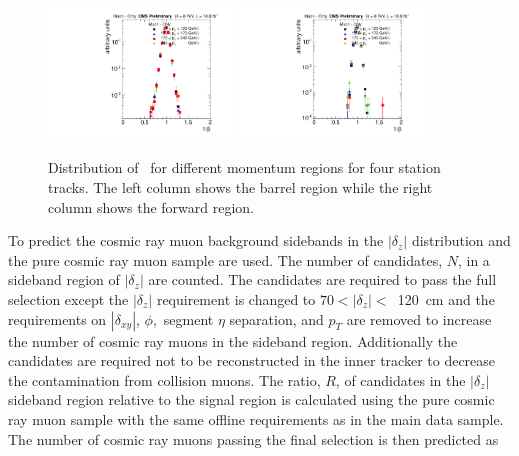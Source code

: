 \begin{figure}
\begin{center}
\includegraphics[clip=true, trim=0.0cm 0cm 3.0cm 0cm,width=0.44\textwidth]{figures/muonly/Control_Data8TeV_Pt_TOFSpectrum_Binned_2}
\includegraphics[clip=true, trim=0.0cm 0cm 3.0cm 0cm,width=0.44\textwidth]{figures/muonly/Control_Data8TeV_Pt_TOFSpectrum_Binned_5}
\caption[Distribution of \invbeta\
  for different momentum regions for four station tracks in the \muononly\ analysis.]
{Distribution of \invbeta\
for different momentum regions for four station tracks.
The  left column shows the barrel region while the right column
shows the forward region.}
\label{fig:MuOnlyControl4}
\end{center}
\end{figure}

To predict the cosmic ray muon background sidebands in the $|\delta_z|$ distribution and the pure cosmic ray muon sample are used. The number of candidates, $N$, 
in a sideband region of $|\delta_z|$ are counted. The candidates are required to pass the full selection except the $|\delta_z|$ requirement 
is changed to $70 < |\delta_z| <$~120~cm and
the requirements on $|\delta_{xy}|$, $\phi,$ segment $\eta$ separation, and $p_T$ are removed to increase the number of cosmic ray muons in the sideband region. 
Additionally the candidates
are required not to be reconstructed in the inner tracker to decrease the contamination from collision muons. The ratio, $R$, of candidates in the $|\delta_z|$ sideband region 
relative to the signal region is calculated using the pure cosmic ray muon sample with the same offline requirements as in the main data sample. The number of cosmic ray muons
passing the final selection is then predicted as 

